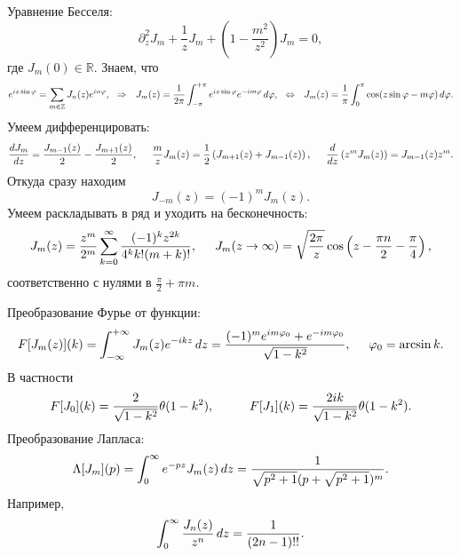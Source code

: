 
Уравнение Бесселя:
\begin{equation*}
    \partial_z^2 J_m + \frac{1}{z} J_m + \left(1 - \frac{m^2}{z^2}\right) J_m = 0,
\end{equation*}
где $J_m(0) \in \mathbb{R}$. Знаем, что
\begin{equation*}
    e^{i z \sin \varphi} = \sum_{m \in \mathbb{Z}} 
    J_n (z) e^{i n \varphi},
    \hspace{0.25cm} \Rightarrow \hspace{0.25cm}
    J_m (z) = \frac{1}{2\pi} \int_{-\pi}^{+\pi}e^{i z \sin \varphi} e^{- i m \varphi} \, d \varphi,
    \hspace{2.5 mm} 
    \Leftrightarrow
    \hspace{2.5 mm} 
    J_m (z) = \frac{1}{\pi} \int_{0}^{\pi} \cos(z \sin \varphi - m \varphi) \, d \varphi.
\end{equation*}
Умеем дифференцировать:
\begin{equation*}
    \frac{d J_m}{d z} = \frac{J_{m-1} (z)}{2} - \frac{J_{m+1}(z)}{2},
    \hspace{5 mm}
    \frac{m}{z} J_m (z) = \frac{1}{2} \left(J_{m+1} (z) + J_{m-1}(z)\right),
    \hspace{5 mm} 
    \frac{d }{d z} \left(z^m J_m (z)\right) = J_{m-1} (z) z^m.
\end{equation*}
Откуда сразу находим
\begin{equation*}
    J_{-m} (z) = (-1)^m J_m (z).
\end{equation*}
Умеем раскладывать в ряд и уходить на бесконечность:
\begin{equation*}
    J_m (z) = \frac{z^m}{2^m} \sum_{k=0}^{\infty} \frac{(-1)^k z^{2k}}{4^k k! (m+k)!},
    \hspace{5 mm} 
    J_m (z \to \infty) = \sqrt{\frac{2 \pi}{z}} \cos\left(
        z - \frac{\pi n }{2} - \frac{\pi}{4}
    \right),
\end{equation*}
соответственно с нулями в $\frac{\pi}{2} + \pi m$. 

Преобразование Фурье от функции:
\begin{equation*}
    F[J_m (z)] (k) = \int_{-\infty}^{+\infty} J_m (z) e^{-ikz} \, d z 
    = \frac{(-1)^m e^{i m \varphi_0} + e^{- i m \varphi_0}}{\sqrt{1 - k^2}}, \hspace{5 mm} 
    \varphi_0 = \arcsin k.
\end{equation*}
В частности
\begin{equation*}
    F[J_0](k) = \frac{2}{\sqrt{1-k^2}} \theta(1-k^2), \hspace{10 mm} 
    F[J_1](k) = \frac{2 i k}{\sqrt{1 - k^2}} \theta(1-k^2).
\end{equation*}
Преобразование Лапласа:
\begin{equation*}
    \Lambda[J_m] (p)=  \int_{0}^{\infty}  e^{- p z} J_m (z) \, d z = 
    \frac{1}{\sqrt{p^2 + 1} (p + \sqrt{p^2 + 1})^m}.
\end{equation*}
Например,
\begin{equation*}
    \int_{0}^{\infty} \frac{J_n (z)}{z^n} \, d z = \frac{1}{(2n-1)!!}.
\end{equation*}

